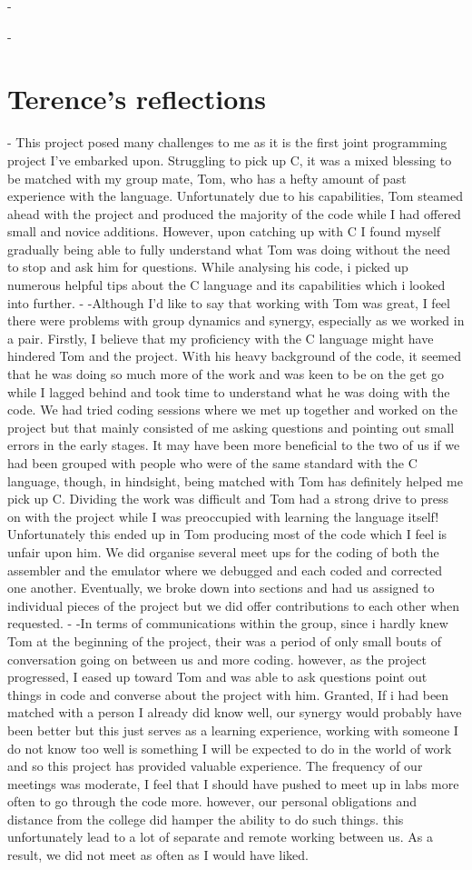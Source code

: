 -\documentclass[11pt]{article}
\begin{document}
-\section{Terence's reflections}
- This project posed many challenges to me as it is the first joint programming project I've embarked upon. Struggling to pick up C, it was a mixed blessing to be matched with my group mate, Tom, who has a hefty amount of past experience with the language. Unfortunately due to his capabilities, Tom steamed ahead with the project and produced the majority of the code while I had offered small and novice additions. However, upon catching up with C I found myself gradually being able to fully understand what Tom was doing without the need to stop and ask him for questions. While analysing his code, i picked up numerous helpful tips about the C language and its capabilities which i looked into further.
-
-Although I'd like to say that working with Tom was great, I feel there were problems with group dynamics and synergy, especially as we worked in a pair. Firstly, I believe that my proficiency with the C language might have hindered Tom and the project. With his heavy background of the code, it seemed that he was doing so much more of the work and was keen to be on the get go while I lagged behind and took time to understand what he was doing with the code. We had tried coding sessions where we met up together and worked on the project but that mainly consisted of me asking questions and pointing out small errors in the early stages. It may have been more beneficial to the two of us if we had been grouped with people who were of the same standard with the C language, though, in hindsight, being matched with Tom has definitely helped me pick up C. Dividing the work was difficult and Tom had a strong drive to press on with the project while I was preoccupied with learning the language itself! Unfortunately this ended up in Tom producing most of the code which I feel is unfair upon him. We did organise several meet ups for the coding of both the assembler and the emulator where we debugged and each coded  and corrected one another. Eventually, we broke down into sections and had us assigned to individual pieces of the project but we did offer contributions to each other when requested.
-
-In terms of communications within the group, since i hardly knew Tom at the beginning of the project, their was a period of only small bouts of conversation going on between us and more coding. however, as the project progressed, I eased up toward Tom and was able to ask questions point out things in code and converse about the project with him. Granted, If i had been matched with a person I already did know well, our synergy would probably have been better but this just serves as a learning experience, working with someone I do not know too well is something I will be expected to do in the world of work and so this project has provided valuable experience. The frequency of our meetings was moderate, I feel that I should have pushed to meet up in labs more often to go through the code more. however, our personal obligations and distance from the college did hamper the ability to do such things. this unfortunately lead to a lot of separate and remote working between us. As a result, we did not meet as often as I would have liked.
\end{document}
